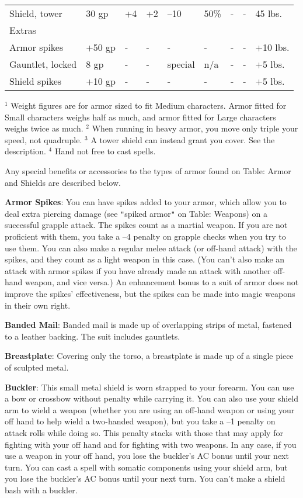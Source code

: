 \begin{table}[]
\begin{tabular}{lllllllll}
 Shield, tower& 30 gp& +4& +2& –10& 50\%& -& -& 45 lbs. \\
 Extras   \\
 Armor spikes& +50 gp& -& -& -& -& -& -& +10 lbs. \\
 Gauntlet, locked& 8 gp& -& -& special& n/a& -& -& +5 lbs. \\
 Shield spikes& +10 gp& -& -& -& -& -& -& +5 lbs.\\
\end{tabular}
\(^{1}\) Weight figures are for armor sized to fit Medium characters. Armor fitted for Small characters weighs half as much, and armor fitted for Large characters weighs twice as much.
\(^{2}\) When running in heavy armor, you move only triple your speed, not quadruple.
\(^{3}\) A tower shield can instead grant you cover. See the description.
\(^{4}\) Hand not free to cast spells.
\end{table}
Any special benefits or accessories to the types of armor found on Table: Armor and Shields are described below.
		
\textbf{Armor Spikes}: You can have spikes added to your armor, which allow you to deal extra piercing damage (see \texttt{{}"{}}spiked armor\texttt{{}"{}} on Table: Weapons) on a successful grapple attack. The spikes count as a martial weapon. If you are not proficient with them, you take a --4 penalty on grapple checks when you try to use them. You can also make a regular melee attack (or off-hand attack) with the spikes, and they count as a light weapon in this case. (You can't also make an attack with armor spikes if you have already made an attack with another off-hand weapon, and vice versa.) An enhancement bonus to a suit of armor does not improve the spikes' effectiveness, but the spikes can be made into magic weapons in their own right.
		
\textbf{Banded Mail}: Banded mail is made up of overlapping strips of metal, fastened to a leather backing. The suit includes gauntlets.
		
\textbf{Breastplate}: Covering only the torso, a breastplate is made up of a single piece of sculpted metal.
		
\textbf{Buckler}: This small metal shield is worn strapped to your forearm. You can use a bow or crossbow without penalty while carrying it. You can also use your shield arm to wield a weapon (whether you are using an off-hand weapon or using your off hand to help wield a two-handed weapon), but you take a --1 penalty on attack rolls while doing so. This penalty stacks with those that may apply for fighting with your off hand and for fighting with two weapons. In any case, if you use a weapon in your off hand, you lose the buckler's AC bonus until your next turn. You can cast a spell with somatic components using your shield arm, but you lose the buckler's AC bonus until your next turn. You can't make a shield bash with a buckler.
		
